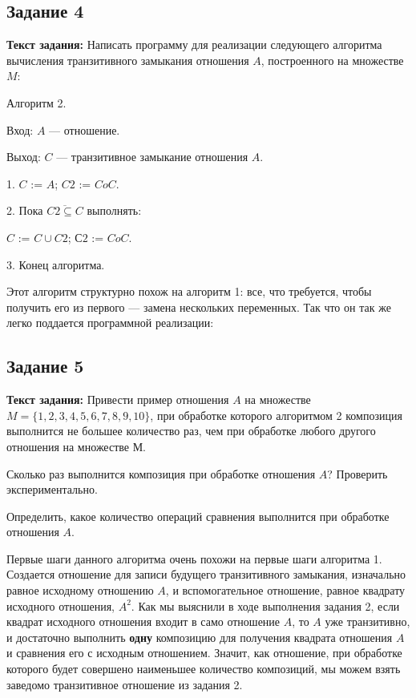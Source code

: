 \documentclass[12pt]{article}
\begin{document}
	\subsection{Задание 4}
	\label{task4}
	{\bf Текст задания:} Написать программу для реализации следующего алгоритма вычисления транзитивного замыкания отношения $A$, построенного на множестве $M$:
	
	{\parskip=0.05cm
	Алгоритм 2.
	
	Вход: $A$ — отношение.
	
	Выход: $C$ — транзитивное замыкание отношения $A$.
	
	1. $C$ := $A$; $C2$ := $C o C$.
	
	2. Пока $\overline{C2 \subseteq C}$ выполнять:
	{\hangindent=2cm  \noindent
	$C$ := $C \cup C2$; $С2$ := $C o C$.
	
	3. Конец алгоритма.
	}
	}
	
	Этот алгоритм структурно похож на алгоритм 1: все, что требуется, чтобы получить его из первого --- замена нескольких переменных. Так что он так же легко поддается программной реализации:
	 
	
	\subsection{Задание 5}
	\label{task5}
	{\bf Текст задания:} Привести пример отношения $A$ на множестве $M = \{1, 2, 3, 4, 5, 6, 7, 8, 9, 10\}$, при обработке которого алгоритмом 2 композиция выполнится не большее количество раз, чем при обработке любого другого отношения на множестве М.
	
	Сколько раз выполнится композиция при обработке отношения $A$? Проверить экспериментально.
	
	Определить, какое количество операций сравнения выполнится при обработке отношения $A$.
	
	Первые шаги данного алгоритма очень похожи на первые шаги алгоритма 1. Создается отношение для записи будущего транзитивного замыкания, изначально равное исходному отношению $A$, и вспомогательное отношение, равное квадрату исходного отношения, $A^2$. Как мы выяснили в ходе выполнения задания 2, если квадрат исходного отношения входит в само отношение $A$, то $A$ уже транзитивно, и достаточно выполнить {\bf одну} композицию для получения квадрата отношения $A$ и сравнения его с исходным отношением. Значит, как отношение, при обработке которого будет совершено наименьшее количество композиций, мы можем взять заведомо транзитивное отношение из задания 2. 
	
\end{document}
